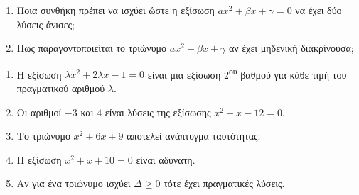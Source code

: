 \documentclass[internet]{diag-xelatex}
\newcommand{\tss}[1]{\textsuperscript{#1}}
\begin{document}
\begin{thema}
\begin{erwthma}
\begin{enumerate}[label=\bf\roman*.]
\item Ποια συνθήκη πρέπει να ισχύει ώστε η εξίσωση $ ax^2+\beta x+\gamma=0 $ να έχει δύο λύσεις άνισες;
\item Πως παραγοντοποιείται το τριώνυμο $ ax^2+\beta x+\gamma $ αν έχει μηδενική διακρίνουσα;
\end{enumerate}
\item \swstolathos
\begin{enumerate}[label=\bf\roman*.]
\item Η εξίσωση $ \lambda x^2+2\lambda x-1=0 $ είναι μια εξίσωση 2\tss{ου} βαθμού για κάθε τιμή του πραγματικού αριθμού $ \lambda $.
\item Οι αριθμοί $ -3 $ και $ 4 $ είναι λύσεις της εξίσωσης $ x^2+x-12=0 $.
\item Το τριώνυμο $ x^2+6x+9 $ αποτελεί ανάπτυγμα ταυτότητας.
\item Η εξίσωση $ x^2+x+10=0 $ είναι αδύνατη.
\item Αν για ένα τριώνυμο ισχύει $ \varDelta\geq 0 $ τότε έχει πραγματικές λύσεις.
\end{enumerate}
\end{erwthma}
\end{thema}
\newpage
\noindent
\askhseis
\end{document}
